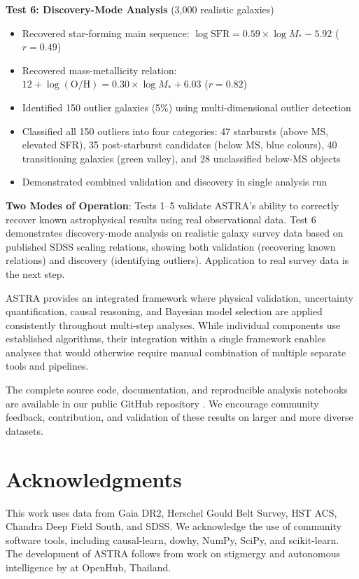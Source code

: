 \documentclass[usenatbib]{rasti}
\begin{document}
\textbf{Test 6: Discovery-Mode Analysis} (3,000 realistic galaxies)
\begin{itemize}
\item Recovered star-forming main sequence: $\log \text{SFR} = 0.59 \times \log M_* - 5.92$ ($r = 0.49$)
\item Recovered mass-metallicity relation: $12 + \log(\text{O/H}) = 0.30 \times \log M_* + 6.03$ ($r = 0.82$)
\item Identified 150 outlier galaxies (5\%) using multi-dimensional outlier detection
\item Classified all 150 outliers into four categories: 47 starbursts (above MS, elevated SFR), 35 post-starburst candidates (below MS, blue colours), 40 transitioning galaxies (green valley), and 28 unclassified below-MS objects
\item Demonstrated combined validation and discovery in single analysis run
\end{itemize}

\textbf{Two Modes of Operation}: Tests 1--5 validate ASTRA's ability to correctly recover known astrophysical results using real observational data. Test 6 demonstrates discovery-mode analysis on realistic galaxy survey data based on published SDSS scaling relations, showing both validation (recovering known relations) and discovery (identifying outliers). Application to real survey data is the next step.

ASTRA provides an integrated framework where physical validation, uncertainty quantification, causal reasoning, and Bayesian model selection are applied consistently throughout multi-step analyses. While individual components use established algorithms, their integration within a single framework enables analyses that would otherwise require manual combination of multiple separate tools and pipelines.

The complete source code, documentation, and reproducible analysis notebooks are available in our public GitHub repository \cite{astra_github}. We encourage community feedback, contribution, and validation of these results on larger and more diverse datasets.

\section*{Acknowledgments}

This work uses data from Gaia DR2, Herschel Gould Belt Survey, HST ACS, Chandra Deep Field South, and SDSS. We acknowledge the use of community software tools, including causal-learn, dowhy, NumPy, SciPy, and scikit-learn. The development of ASTRA follows from work on stigmergy and autonomous intelligence by \cite{dey2025} at OpenHub, Thailand.
\end{document}
